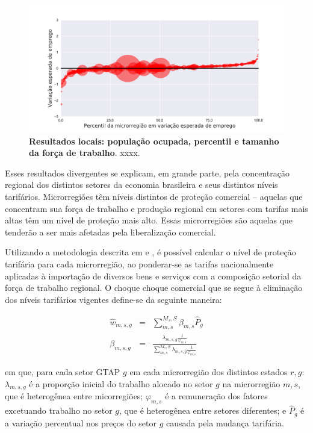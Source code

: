 \documentclass{article}
\begin{document}
\begin{landscape}
\begin{figure}[htbp]
    \centering
    \includegraphics[scale=1]{laborforce.pdf}
    \caption[Resultados locais: população ocupada, percentil e tamanho da força de trabalho]{\textbf{Resultados locais: população ocupada, percentil e tamanho da força de trabalho}. xxxx.}
    \label{fig:percentil}
\end{figure}
\end{landscape}
\newpage

Esses resultados divergentes se explicam, em grande parte, pela concentração regional dos distintos setores da economia brasileira e seus distintos níveis tarifários. Microrregiões têm níveis distintos de proteção comercial – aquelas que concentram sua força de trabalho e produção regional em setores com tarifas mais altas têm um nível de proteção mais alto. Essas microrregiões são aquelas que tenderão a ser mais afetadas pela liberalização comercial.

Utilizando a metodologia descrita em \textcite{dixkovak} e \textcite{kovak}, é possível calcular o nível de proteção tarifária para cada microrregião, ao ponderar-se as tarifas nacionalmente aplicadas à importação de diversos bens e serviços com a composição setorial da força de trabalho regional. O choque choque comercial que se segue à eliminação dos níveis tarifários vigentes define-se da seguinte maneira:

\begin{eqnarray}
    \hat{w}_{m,s,g} &=& \sum_{m,s}^{M_s,S} \beta_{m,s} \hat{P}_g \\
    \beta_{m,s,g} &=& \frac{ \lambda_{m,s,g} \frac{1}{\varphi_{m,s}} }{ \sum_{m,s}^{M_s,S} \lambda_{m,s,g}\frac{1}{\varphi_{m,s} }}
\end{eqnarray}

em que, para cada setor GTAP \(g\) em cada microrregião dos distintos estados \(r,g\): \(\lambda_{m,s,g}\) é a proporção inicial do trabalho alocado no setor  \(g\) na microrregião \(m,s\), que é heterogênea entre micorregiões; \(\varphi_{m,s}\) é a remuneração dos fatores excetuando trabalho no setor \(g\), que é heterogênea entre setores diferentes; e \(\hat{P}_g\) é a variação percentual nos preços do setor \(g\) causada pela mudança tarifária.
\end{document}
